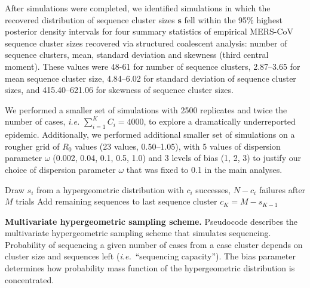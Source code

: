 \documentclass[11pt,oneside,letterpaper]{article}
\begin{document}
After simulations were completed, we identified simulations in which the recovered distribution of sequence cluster sizes $\mathbf{s}$ fell within the 95\% highest posterior density intervals for four summary statistics of empirical MERS-CoV sequence cluster sizes recovered via structured coalescent analysis: number of sequence clusters, mean, standard deviation and skewness (third central moment).
These values were 48-61 for number of sequence clusters, 2.87--3.65 for mean sequence cluster size, 4.84--6.02 for standard deviation of sequence cluster sizes, and 415.40--621.06 for skewness of sequence cluster sizes.

We performed a smaller set of simulations with 2500 replicates and twice the number of cases, \textit{i.e.} $\sum_{i=1}^{K} C_{i} = 4000$, to explore a dramatically underreported epidemic.
Additionally, we performed additional smaller set of simulations on a rougher grid of $R_{0}$ values (23 values, 0.50--1.05), with 5 values of dispersion parameter $\omega$ (0.002, 0.04, 0.1, 0.5, 1.0) and 3 levels of bias (1, 2, 3) to justify our choice of dispersion parameter $\omega$ that was fixed to 0.1 in the main analyses.

\begin{algorithm}[H]
 Draw $s_i$ from a hypergeometric distribution with $c_i$ successes, $N-c_i$ failures after $M$ trials\;
 Add remaining sequences to last sequence cluster $c_K = M - s_{K-1}$\;
 \caption{\textbf{Multivariate hypergeometric sampling scheme.}
 Pseudocode describes the multivariate hypergeometric sampling scheme that simulates sequencing.
 Probability of sequencing a given number of cases from a case cluster depends on cluster size and sequences left (\textit{i.e.}\ ``sequencing capacity'').
 The bias parameter determines how probability mass function of the hypergeometric distribution is concentrated.
 }
 \label{hypergeometric}
\end{algorithm}
\end{document}
